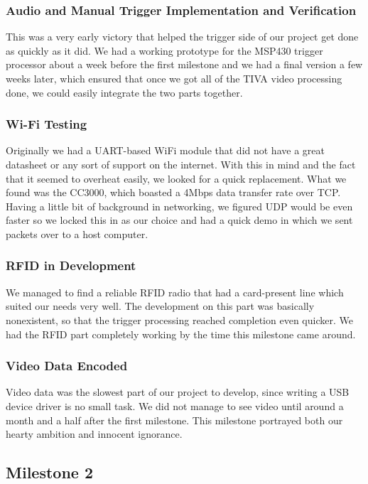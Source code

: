 \documentclass[12pt]{article}
\begin{document}
\subsubsection{Audio and Manual Trigger Implementation and Verification}
This was a very early victory that helped the trigger side of our project get
done as quickly as it did. We had a working prototype for the MSP430 trigger
processor about a week before the first milestone and we had a final version a
few weeks later, which ensured that once we got all of the TIVA video
processing done, we could easily integrate the two parts together.

\subsubsection{Wi-Fi Testing}
Originally we had a UART-based WiFi module that did not have a great datasheet
or any sort of support on the internet. With this in mind and the fact that it
seemed to overheat easily, we looked for a quick replacement. What we found was
the CC3000, which boasted a 4Mbps data transfer rate over TCP. Having a little
bit of background in networking, we figured UDP would be even faster so we
locked this in as our choice and had a quick demo in which we sent packets over
to a host computer.

\subsubsection{RFID in Development}
We managed to find a reliable RFID radio that had a card-present line which
suited our needs very well. The development on this part was basically
nonexistent, so that the trigger processing reached completion even quicker. We
had the RFID part completely working by the time this milestone came around.

\subsubsection{Video Data Encoded}
Video data was the slowest part of our project to develop, since writing a USB
device driver is no small task. We did not manage to see video until around a
month and a half after the first milestone. This milestone portrayed both our
hearty ambition and innocent ignorance.

\subsection{Milestone 2}
\end{document}
